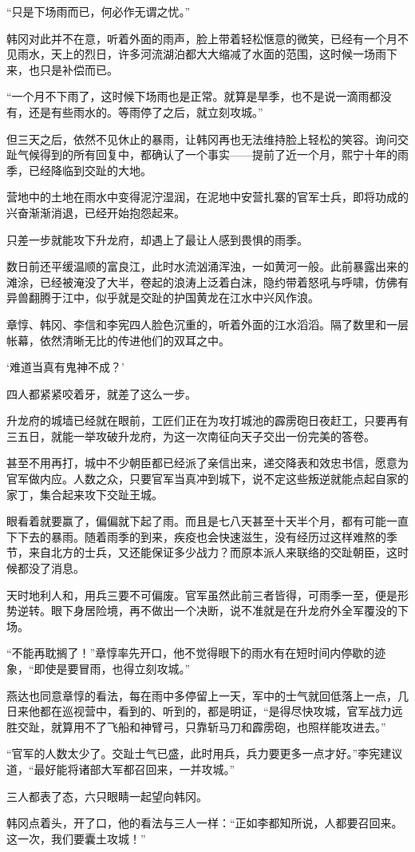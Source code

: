 “只是下场雨而已，何必作无谓之忧。”

韩冈对此并不在意，听着外面的雨声，脸上带着轻松惬意的微笑，已经有一个月不见雨水，天上的烈日，许多河流湖泊都大大缩减了水面的范围，这时候一场雨下来，也只是补偿而已。

“一个月不下雨了，这时候下场雨也是正常。就算是旱季，也不是说一滴雨都没有，还是有些雨水的。等雨停了之后，就立刻攻城。”

但三天之后，依然不见休止的暴雨，让韩冈再也无法维持脸上轻松的笑容。询问交趾气候得到的所有回复中，都确认了一个事实——提前了近一个月，熙宁十年的雨季，已经降临到交趾的大地。

营地中的土地在雨水中变得泥泞湿润，在泥地中安营扎寨的官军士兵，即将功成的兴奋渐渐消退，已经开始抱怨起来。

只差一步就能攻下升龙府，却遇上了最让人感到畏惧的雨季。

数日前还平缓温顺的富良江，此时水流汹涌浑浊，一如黄河一般。此前暴露出来的滩涂，已经被淹没了大半，卷起的浪涛上泛着白沫，隐约带着怒吼与呼啸，仿佛有异兽翻腾于江中，似乎就是交趾的护国黄龙在江水中兴风作浪。

章惇、韩冈、李信和李宪四人脸色沉重的，听着外面的江水滔滔。隔了数里和一层帐幕，依然清晰无比的传进他们的双耳之中。

‘难道当真有鬼神不成？’

四人都紧紧咬着牙，就差了这么一步。

升龙府的城墙已经就在眼前，工匠们正在为攻打城池的霹雳砲日夜赶工，只要再有三五日，就能一举攻破升龙府，为这一次南征向天子交出一份完美的答卷。

甚至不用再打，城中不少朝臣都已经派了亲信出来，递交降表和效忠书信，愿意为官军做内应。人数之众，只要官军当真冲到城下，说不定这些叛逆就能点起自家的家丁，集合起来攻下交趾王城。

眼看着就要赢了，偏偏就下起了雨。而且是七八天甚至十天半个月，都有可能一直下下去的暴雨。随着雨季的到来，疾疫也会快速滋生，没有经历过这样难熬的季节，来自北方的士兵，又还能保证多少战力？而原本派人来联络的交趾朝臣，这时候都没了消息。

天时地利人和，用兵三要不可偏废。官军虽然此前三者皆得，可雨季一至，便是形势逆转。眼下身居险境，再不做出一个决断，说不准就是在升龙府外全军覆没的下场。

“不能再耽搁了！”章惇率先开口，他不觉得眼下的雨水有在短时间内停歇的迹象，“即使是要冒雨，也得立刻攻城。”

燕达也同意章惇的看法，每在雨中多停留上一天，军中的士气就回低落上一点，几日来他都在巡视营中，看到的、听到的，都是明证，“是得尽快攻城，官军战力远胜交趾，就算用不了飞船和神臂弓，只靠斩马刀和霹雳砲，也照样能攻进去。”

“官军的人数太少了。交趾士气已盛，此时用兵，兵力要更多一点才好。”李宪建议道，“最好能将诸部大军都召回来，一并攻城。”

三人都表了态，六只眼睛一起望向韩冈。

韩冈点着头，开了口，他的看法与三人一样：“正如李都知所说，人都要召回来。这一次，我们要囊土攻城！”

